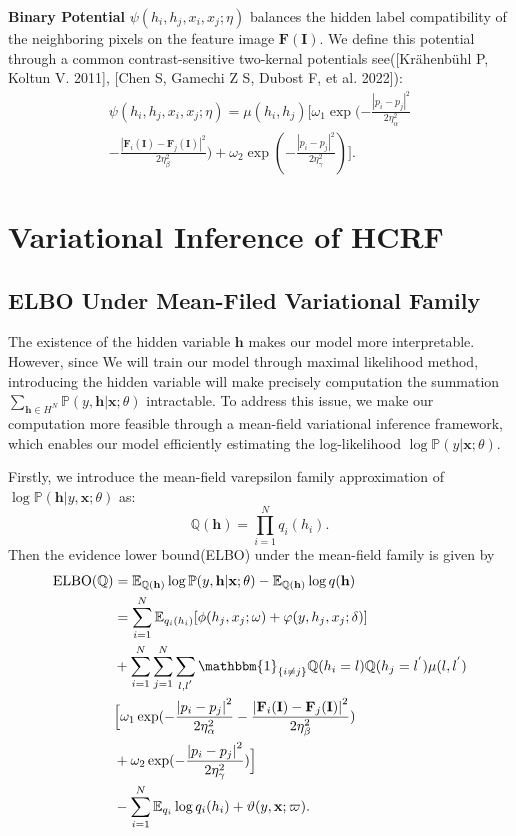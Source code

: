 \documentclass[conference]{IEEEtran}
\newcommand{\E}{{\mathbb E}}
\newcommand{\PP}{{\mathbb P}}
\begin{document}
\noindent
{\textbf{Binary Potential}} \(\psi(h_{i}, h_{j}, x_{i}, x_{j}; \eta)\) 
balances the hidden label compatibility of the neighboring pixels on the feature image \(\mathbf{F}(\mathbf{I})\).
We define this potential through a common contrast-sensitive two-kernal potentials see([Krähenbühl P, Koltun V. 2011], [Chen S, Gamechi Z S, Dubost F, et al. 2022]):
\begin{eqnarray}
	 \psi(h_{i}, h_{j}, x_{i}, x_{j};  \eta) = \mu(h_{i}, h_{j}) \Big[ \omega_{1} 
	\exp ( - \frac{\left\lvert p_{i} - p_{j} \right\rvert^{2} }{2 \eta_{\alpha}^{2}}\\
	 - \frac{\left\lvert \mathbf{F}_{i}(\mathbf{I}) - \mathbf{F}_{j}(\mathbf{I}) \right\rvert^{2} }{2 \eta_{\beta}^{2}}) 
	 + \omega_{2}\exp ( - \frac{\left\lvert p_{i} - p_{j} \right\rvert^{2}}{2 \eta_{\gamma}^{2}})\Big].
\end{eqnarray}

\section{Variational Inference of HCRF}
\subsection{\textbf{ELBO Under Mean-Filed Variational Family}}
The existence of the hidden variable \(\mathbf{h}\) makes our model more interpretable. However, since We will train our model through maximal likelihood method, 
 introducing the hidden variable will make precisely computation the summation \(\sum_{\mathbf{h} \in H^{N}} \mathbb{P}(y, \mathbf{h}| \mathbf{x}; \theta)\) intractable.
To address this issue, we make our computation more feasible through a mean-field variational inference framework, which enables our model efficiently estimating the log-likelihood \(\log\PP(y| \mathbf{x}; \theta).\)

Firstly, we introduce the mean-field varepsilon family approximation of \(\log\PP (\mathbf{h}|y, \mathbf{x};\theta)\) as:
\[
	\mathbb{Q}(\mathbf{h}) = \prod_{i=1}^{N} q_{i}(h_{i}).
\]
Then the evidence lower bound(ELBO) under the mean-field family is given by
\begin{align}
	\textrm{ELBO}(\mathbb{Q}) & = \E_{\mathbb{Q}(\mathbf{h})}\log \PP (y, \mathbf{h}| \mathbf{x}; \theta) - \E_{\mathbb{Q}(\mathbf{h})}\log q(\mathbf{h}) \\
	& = \sum_{i=1}^{N} \E_{q_{i}(h_{i})} [\phi(h_{j}, x_{j}; \omega) + \varphi
	(y, h_{j}, x_{j}; \delta) ]  \\ 
	& + \sum_{i=1}^{N} \sum_{j=1}^{N} \sum_{l,l^{'}} \mathbbm{1}_{\{i \neq j\}} \mathbb{Q}(h_{i} = l)\mathbb{Q}(h_{j} = l^{'})\mu(l, l^{'}) \\
	& 
	\Big[ \omega_{1} 
	\exp ( - \frac{\left\lvert p_{i} - p_{j} \right\rvert^{2} }{2 \eta_{\alpha}^{2}}
	 - \frac{\left\lvert \mathbf{F}_{i}(\mathbf{I}) - \mathbf{F}_{j}(\mathbf{I}) \right\rvert^{2} }{2 \eta_{\beta}^{2}}) \\
	 & + \omega_{2}\exp ( - \frac{\left\lvert p_{i} - p_{j} \right\rvert^{2}}{2 \eta_{\gamma}^{2}})\Big] \\ 
	&  - \sum_{i=1}^{N}\E_{q_{i}}\log q_{i}(h_{i}) + \vartheta(y, \mathbf{x}; \varpi).
\end{align}
\end{document}
